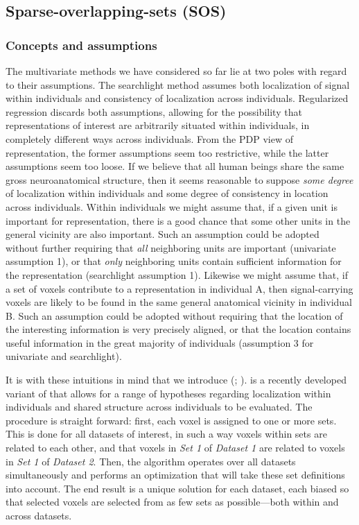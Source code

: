 \subsection{Sparse-overlapping-sets (SOS) {\lasso}}
\subsubsection{Concepts and assumptions}
The multivariate methods we have considered so far lie at two poles with regard to their assumptions. The searchlight method assumes both localization of signal within individuals and consistency of localization across individuals. Regularized regression discards both assumptions, allowing for the possibility that representations of interest are arbitrarily situated within individuals, in completely different ways across individuals. From the PDP view of representation, the former assumptions seem too restrictive, while the latter assumptions seem too loose. If we believe that all human beings share the same gross neuroanatomical structure, then it seems reasonable to suppose {\em some degree} of localization within individuals and some degree of consistency in location across individuals. Within individuals we might assume that, if a given unit is important for representation, there is a good chance that some other units in the general vicinity are also important. Such an assumption could be adopted without further requiring that {\em all} neighboring units are important (univariate assumption 1), or that {\em only} neighboring units contain sufficient information for the representation (searchlight assumption 1). Likewise we might assume that, if a set of voxels contribute to a representation in individual A, then signal-carrying voxels are likely to be found in the same general anatomical vicinity in individual B. Such an assumption could be adopted without requiring that the location of the interesting information is very precisely aligned, or that the location contains useful information in the great majority of individuals (assumption 3 for univariate and searchlight).

It is with these intuitions in mind that we introduce {\soslasso} ({\soslassofull}; ). {\soslasso} is a recently developed variant of {\lasso} that allows for a range of hypotheses regarding localization within individuals and shared structure across individuals to be evaluated. The procedure is straight forward: first, each voxel is assigned to one or more sets. This is done for all datasets of interest, in such a way voxels within sets are related to each other, and that voxels in {\em Set 1} of {\em Dataset 1} are related to voxels in {\em Set 1} of {\em Dataset 2}. Then, the algorithm operates over all datasets simultaneously and performs an optimization that will take these set definitions into account. The end result is a unique solution for each dataset, each biased so that selected voxels are selected from as few sets as possible---both within and across datasets. 

